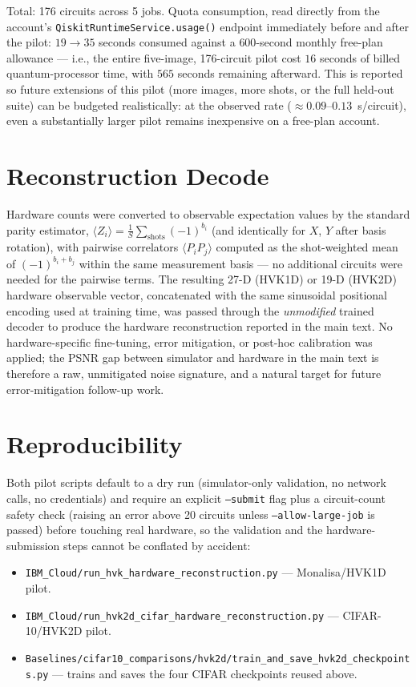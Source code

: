 \documentclass[11pt]{article}
\begin{document}
Total: 176 circuits across 5 jobs. Quota consumption, read directly from the account's \texttt{QiskitRuntimeService.usage()} endpoint immediately before and after the pilot: $19\rightarrow35$ seconds consumed against a $600$-second monthly free-plan allowance --- i.e., the entire five-image, 176-circuit pilot cost $16$ seconds of billed quantum-processor time, with $565$ seconds remaining afterward. This is reported so future extensions of this pilot (more images, more shots, or the full held-out suite) can be budgeted realistically: at the observed rate ($\approx\!0.09$--$0.13$~s/circuit), even a substantially larger pilot remains inexpensive on a free-plan account.

\section{Reconstruction Decode}
Hardware counts were converted to observable expectation values by the standard parity estimator, $\langle Z_i\rangle = \frac{1}{S}\sum_{\text{shots}} (-1)^{b_i}$ (and identically for $X$, $Y$ after basis rotation), with pairwise correlators $\langle P_iP_j\rangle$ computed as the shot-weighted mean of $(-1)^{b_i+b_j}$ within the same measurement basis --- no additional circuits were needed for the pairwise terms. The resulting 27-D (HVK1D) or 19-D (HVK2D) hardware observable vector, concatenated with the same sinusoidal positional encoding used at training time, was passed through the \emph{unmodified} trained decoder to produce the hardware reconstruction reported in the main text. No hardware-specific fine-tuning, error mitigation, or post-hoc calibration was applied; the PSNR gap between simulator and hardware in the main text is therefore a raw, unmitigated noise signature, and a natural target for future error-mitigation follow-up work.

\section{Reproducibility}
Both pilot scripts default to a dry run (simulator-only validation, no network calls, no credentials) and require an explicit \texttt{--submit} flag plus a circuit-count safety check (raising an error above 20 circuits unless \texttt{--allow-large-job} is passed) before touching real hardware, so the validation and the hardware-submission steps cannot be conflated by accident:
\begin{itemize}
    \item \texttt{IBM\_Cloud/run\_hvk\_hardware\_reconstruction.py} --- Monalisa/HVK1D pilot.
    \item \texttt{IBM\_Cloud/run\_hvk2d\_cifar\_hardware\_reconstruction.py} --- CIFAR-10/HVK2D pilot.
    \item \texttt{Baselines/cifar10\_comparisons/hvk2d/train\_and\_save\_hvk2d\_checkpoints.py} --- trains and saves the four CIFAR checkpoints reused above.
\end{itemize}
\end{document}

